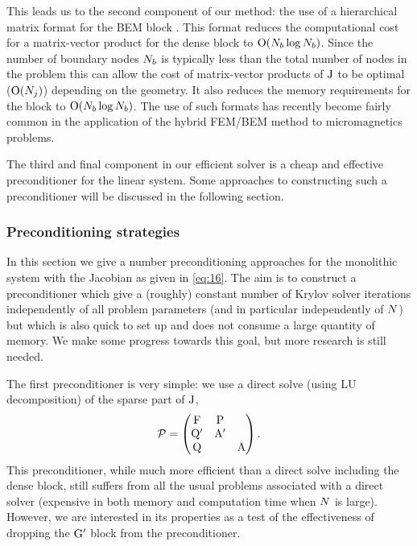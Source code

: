 This leads us to the second component of our method: the use of a hierarchical matrix format for the BEM block \cite{Borm2003,Forster2003,Knittel2011}.
This format reduces the computational cost for a matrix-vector product for the dense block to $\mathrm{O}{\left( N_b \log N_b \right)}$.
Since the number of boundary nodes $N_b$ is typically less than the total number of nodes in the problem this can allow the cost of matrix-vector products of $\mathrm{J}$ to be optimal (\ie $\mathrm{O}{\left( N_j \right)}$) depending on the geometry.
It also reduces the memory requirements for the block to $\mathrm{O}{\left( N_b \log N_b \right)}$.
The use of such formats has recently become fairly common in the application of the hybrid FEM/BEM method to micromagnetics problems.

The third and final component in our efficient solver is a cheap and effective preconditioner for the linear system.
Some approaches to constructing such a preconditioner will be discussed in the following section.


\subsubsection{Preconditioning strategies}
\label{sec:bem-solver-strategies}

\newcommand{\preca}{\mathcal{P}}
\newcommand{\precb}{\mathcal{Q}}
\newcommand{\precc}{\mathcal{R}}


\newcommand{\inexact}[1]{\widetilde{#1}}
\newcommand{\parinexact}[1]{\hat{#1}}
\newcommand{\pbin}{\inexact{\precb}}
\newcommand{\pcin}{\inexact{\precc}}




In this section we give a number preconditioning approaches for the monolithic system with the Jacobian as given in \cref{eq:16}.
The aim is to construct a preconditioner which give a (roughly) constant number of Krylov solver iterations independently of all problem parameters (and in particular independently of $N$) but which is also quick to set up and does not consume a large quantity of memory.
We make some progress towards this goal, but more research is still needed.

The first preconditioner is very simple: we use a direct solve (using LU decomposition) of the sparse part of $\mathrm{J}$, \ie
\begin{equation}
  \preca =
  \begin{pmatrix}
    \Fm       & \Pm     &  \\
    \Qm'       & \Am'    &   \\
    \Qm       &         &   \Am
  \end{pmatrix}.
\end{equation}
This preconditioner, while much more efficient than a direct solve including the dense block, still suffers from all the usual problems associated with a direct solver (\ie expensive in both memory and computation time when $N$ is large).
However, we are interested in its properties as a test of the effectiveness of dropping the $\mathrm{G}'$ block from the preconditioner.

